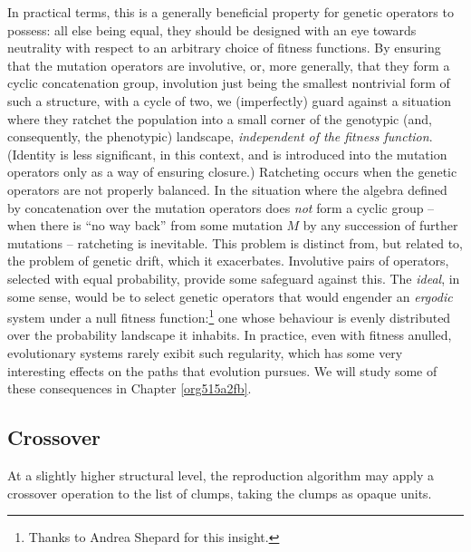 \documentclass[12pt,glossary]{dalthesis}
\begin{document}
In practical terms, this is a generally beneficial property for genetic
operators to possess: all else being equal, they should be designed with
an eye towards neutrality with respect to an arbitrary choice of fitness
functions. By ensuring that the mutation operators are involutive, or, more
generally, that they form a cyclic concatenation group, involution just being
the smallest nontrivial form of such a structure, with a cycle of two, we
(imperfectly) guard against a situation where they ratchet the population into a
small corner of the genotypic (and, consequently, the phenotypic) landscape,
\emph{independent of the fitness function}. (Identity is less significant, in this
context, and is introduced into the mutation operators only
as a way of ensuring closure.) Ratcheting occurs when the genetic
operators are not properly balanced. In the situation where the algebra defined
by concatenation over the mutation operators does \emph{not} form a cyclic group --
when there is ``no way back'' from some mutation \(M\) by any succession of further
mutations -- ratcheting is inevitable. This problem is distinct from, but
related to, the problem of genetic drift, which it exacerbates. Involutive pairs
of operators, selected with equal probability, provide some safeguard against
this. The \emph{ideal}, in some sense, would be to select genetic operators that
would engender an \emph{ergodic} system under a null fitness function:\footnote{Thanks to
Andrea Shepard for this insight.} one whose behaviour is evenly distributed
over the probability landscape it inhabits. In practice, even with fitness
anulled, evolutionary systems rarely exibit such regularity, which has some very
interesting effects on the paths that evolution pursues. We will study some of
these consequences in Chapter \ref{org515a2fb}.


\subsection{Crossover}
\label{sec:org9312f73}
\label{orgb14d4bf} 

At a slightly higher structural level, the reproduction
algorithm may apply a crossover operation to the list of clumps, taking the
clumps as opaque units.
\end{document}
